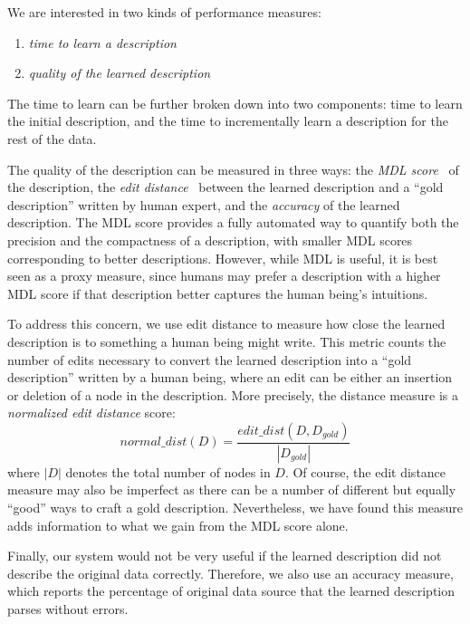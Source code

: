 We are interested in two kinds of performance measures: 
\begin{enumerate}
\item {\em time to learn a description} 
\item {\em quality of the learned description} 
\end{enumerate}

The time to learn can be further
broken down into two components: time to learn the initial description,
and the time to incrementally learn a description for the rest of the data.

The quality of the description can be measured in three ways:
the {\em MDL score}~\cite{mdlbook} of the description, the {\em edit distance}~\cite{Bille05:EditDistance} between the learned
description and a ``gold description'' written by human expert, and the {\em accuracy}
of the learned description.  The MDL score 
provides a fully automated way to quantify both the
precision and the compactness of a description, with smaller MDL scores corresponding to better descriptions.
However, while MDL is useful, it is best seen as a proxy measure, since humans may prefer a description with a higher MDL score if that description better captures the human being's intuitions. 


To address this concern, we use edit distance to measure how close the learned description is to something a human being might write.
This metric counts the number of edits necessary to convert the learned description into a ``gold description'' written by a human being, where an edit can be either an insertion or deletion of a node in the description. 
More precisely, the distance measure is a {\em normalized edit distance} score:
\[normal\_dist(D) = \frac{edit\_dist(D, D_{gold})}{|D_{gold}|}\]
where $|D|$ denotes the total number of nodes in $D$.
Of course, the edit distance measure may also be imperfect as there can be a number of different but equally ``good'' ways 
to craft a gold description.  Nevertheless, we have found this measure
adds information to what we gain from the MDL score alone.

Finally, our system would not be very useful if the learned description 
did not describe the original data correctly. Therefore, we also use an accuracy measure, 
which reports the percentage of original data source that the 
learned description parses without errors.


